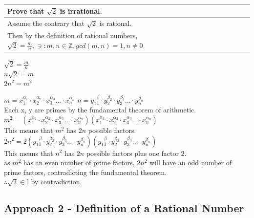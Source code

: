 \documentclass{article}
\begin{document}
\begin{center}
\begin{tabular}{l}
Prove that $\sqrt{2}$ is irrational.\\
\hline

Assume the contrary that $\sqrt{2}$ is rational.\\
Then by the definition of rational numbers, $\sqrt{2} = \frac{m}{n}, \ni: m ,n \in \mathbb Z, gcd(m,n) = 1, n \neq 0$\\
\end{tabular}

\vspace{0.3cm}

{\large
$\sqrt{2} = \frac{m}{n}$\\
$n\sqrt{2} = m$\\
$2n^2 = m^2$\\}

\onehalfspacing

$m = x_1^{\alpha_1} \cdot x_2^{\alpha_2} \cdot x_3^{\alpha_3} \dots \cdot x_n^{\alpha_n}$ \hspace{0.3cm} $n = y_1{^\beta_1} \cdot y_2^{\beta_2} \cdot y_3^{\beta_3} \dots \cdot y_n^{\beta_n}$\\
Each x, y are primes by the fundamental theorem of arithmetic.\\
$m^2 = (x_1^{\alpha_1} \cdot x_2^{\alpha_2} \cdot x_3^{\alpha_3} \dots \cdot x_n^{\alpha_n})(x_1^{\alpha_1} \cdot x_2^{\alpha_2} \cdot x_3^{\alpha_3} \dots \cdot x_n^{\alpha_n})$\\
This means that $m^2$ has $2n$ possible factors.\\
$2n^2 = 2(y_1{^\beta_1} \cdot y_2^{\beta_2} \cdot y_3^{\beta_3} \dots \cdot y_n^{\beta_n})(y_1{^\beta_1} \cdot y_2^{\beta_2} \cdot y_3^{\beta_3} \dots \cdot y_n^{\beta_n})$\\
This means that $n^2$ has $2n$ possible factors plus one factor $2$.\\
as $m^2$ has an even number of prime factors, $2n^2$ will have an odd number of prime factors, contradicting the fundamental theorem.\\
$\therefore \sqrt{2} \in \mathbb I$ by contradiction. 


\vspace{0.5cm}

\end{center}

\subsection{Approach 2 - Definition of a Rational Number}
\end{document}
